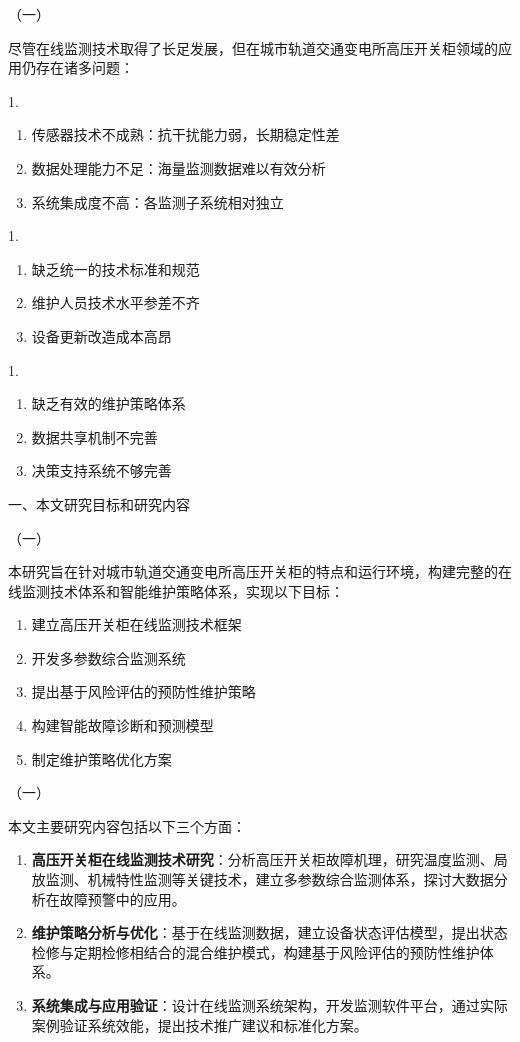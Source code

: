 （一）

尽管在线监测技术取得了长足发展，但在城市轨道交通变电所高压开关柜领域的应用仍存在诸多问题：

1.
\begin{enumerate}
    \item 传感器技术不成熟：抗干扰能力弱，长期稳定性差
    \item 数据处理能力不足：海量监测数据难以有效分析
    \item 系统集成度不高：各监测子系统相对独立
\end{enumerate}

1.
\begin{enumerate}
    \item 缺乏统一的技术标准和规范
    \item 维护人员技术水平参差不齐
    \item 设备更新改造成本高昂
\end{enumerate}

1.
\begin{enumerate}
    \item 缺乏有效的维护策略体系
    \item 数据共享机制不完善
    \item 决策支持系统不够完善
\end{enumerate}

一、本文研究目标和研究内容

（一）

本研究旨在针对城市轨道交通变电所高压开关柜的特点和运行环境，构建完整的在线监测技术体系和智能维护策略体系，实现以下目标：
\begin{enumerate}
    \item 建立高压开关柜在线监测技术框架
    \item 开发多参数综合监测系统
    \item 提出基于风险评估的预防性维护策略
    \item 构建智能故障诊断和预测模型
    \item 制定维护策略优化方案
\end{enumerate}

（一）

本文主要研究内容包括以下三个方面：

\begin{enumerate}
    \item \textbf{高压开关柜在线监测技术研究}：分析高压开关柜故障机理，研究温度监测、局放监测、机械特性监测等关键技术，建立多参数综合监测体系，探讨大数据分析在故障预警中的应用。

    \item \textbf{维护策略分析与优化}：基于在线监测数据，建立设备状态评估模型，提出状态检修与定期检修相结合的混合维护模式，构建基于风险评估的预防性维护体系。

    \item \textbf{系统集成与应用验证}：设计在线监测系统架构，开发监测软件平台，通过实际案例验证系统效能，提出技术推广建议和标准化方案。
\end{enumerate}
